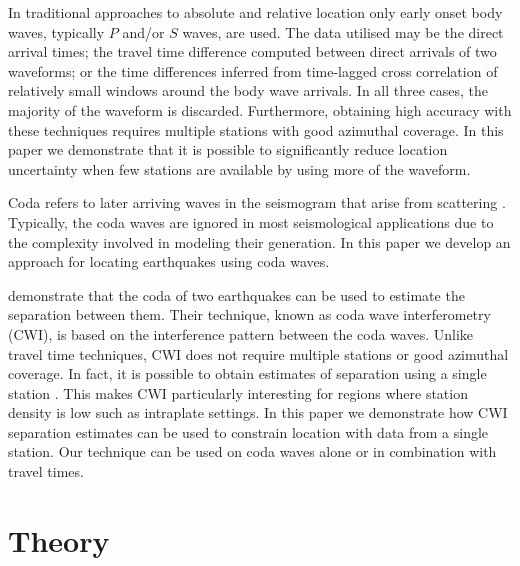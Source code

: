 \documentclass[extra]{gji}
\begin{document}
In traditional approaches to absolute and relative location
only early onset body waves, typically $P$ and/or $S$ waves, are used.
The data utilised may be the direct arrival times; the travel time difference computed
between direct arrivals of two waveforms; or the time differences
inferred from time-lagged cross correlation of relatively small windows
around the body wave arrivals.
 In all three cases, the majority of the
waveform is discarded. Furthermore, obtaining high accuracy with these techniques
requires multiple stations with good azimuthal coverage.
In this paper we demonstrate that it is possible to
significantly reduce location uncertainty when few stations are
available by using more of the waveform.

Coda refers to  later arriving waves in the seismogram that arise from
scattering  \citep{dr_Aki69a,dr_Snieder99a,dr_Snieder06a}.
Typically, the coda waves are ignored in most seismological
applications due to the complexity involved in modeling their
generation. In this
paper we develop an approach for locating earthquakes using coda waves.

\citet{dr_Snieder05a} demonstrate that the coda of two earthquakes
can be used to estimate the separation between them. Their
technique, known as coda wave interferometry (CWI), is based on the
interference pattern between the coda waves. Unlike travel time
techniques, CWI
 does not require multiple stations or good azimuthal coverage.
In fact, it is possible to obtain estimates of separation using a single
station \citep{dr_Robinson07b}. This makes CWI particularly interesting
for regions where station density is low such as intraplate settings. In this 
paper we demonstrate how CWI separation estimates can be used to constrain 
location with data from a single station. 
Our technique can be used on coda waves alone or in combination with
travel times. 

\section{Theory}
\label{sec:theory}
\end{document}

